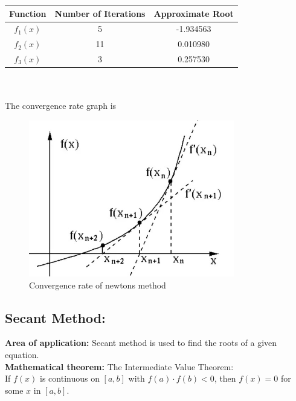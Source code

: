 \documentclass{article}
\begin{document}
	\begin{tabular}{|c|c|c|}
		\hline 
		Function &
		Number of Iterations &
		Approximate Root
		\\ 
		\hline
		
		$f_1(x)$ & 5 &  -1.934563 \\
		\hline 
		$f_2(x)$ & 11 & 0.010980 \\
		\hline
		$f_3(x)$ & 3 & 0.257530 \\
		\hline
		
	\end{tabular}\\
	\\[0.1in]
	The convergence rate graph is
	\begin{figure}[H]
		\caption{Convergence rate of newtons method}
		\includegraphics[width=0.8\textwidth, height=0.6\textwidth]{newtons_roots.jpg}
	\end{figure}
	\subsection{Secant Method:}
	
	{\bf Area of application:} Secant method is used to find the roots of a given equation.\\
	
	{\bf Mathematical theorem:} The Intermediate Value Theorem: \\[0.1in]
	If $f(x)$ is continuous on $[a,b]$ with $f(a)\cdot f(b)<0$, then $f(x) = 0$ for some $x$ in $[a,b]$.\\
	
\end{document}
